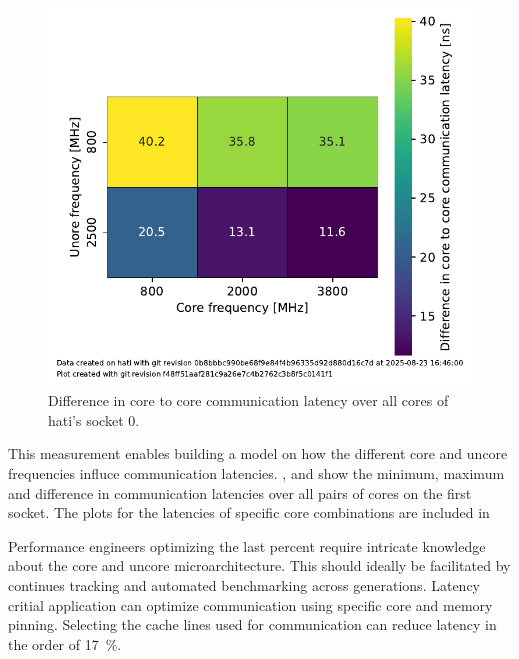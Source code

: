 \begin{figure}[]
    \centering
    \includegraphics[width=0.8\columnwidth]{fig/core-to-core-latency/all-to-all-heatmap-diff.pdf}
    \caption{\label{fig:cbo-latencies-socket-diff}Difference in core to core communication latency over all cores of hati's socket 0.}
\end{figure}

This measurement enables building a model on how the different core and uncore frequencies influce communication latencies.
, and  show the minimum, maximum and difference in communication latencies over all pairs of cores on the first socket.
The plots for the latencies of specific core combinations are included in~

Performance engineers optimizing the last percent require intricate knowledge about the core and uncore microarchitecture.
This should ideally be facilitated by continues tracking and automated benchmarking across generations.
Latency critial application can optimize communication using specific core and memory pinning.
Selecting the cache lines used for communication can reduce latency in the order of \SI{17}{\percent}.